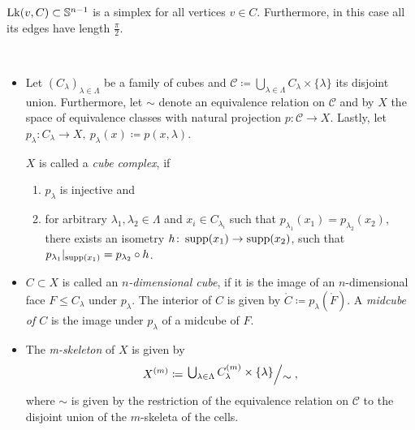 \begin{rem}
  \(\operatorname{Lk}(v,C) \subset \mathbb{S}^{n-1}\) is a simplex for all vertices \(v \in C\). Furthermore, in this case all its edges have length \(\frac{\pi}{2}\).
\end{rem}

\begin{defin}\ 
  \begin{itemize}
  \item Let \((C_\lambda)_{\lambda \in \Lambda}\) be a family of cubes and \(\mathcal{C} \coloneqq \bigcup_{\lambda \in \Lambda} C_\lambda \times \{\lambda\}\) its disjoint union. Furthermore, let \(\sim\) denote an equivalence relation on \(\mathcal{C}\) and by \(X\) the space of equivalence classes with natural projection \(p \colon \mathcal{C} \to X\). Lastly, let \(p_\lambda \colon C_\lambda \to X,\ p_\lambda(x) \coloneqq p(x, \lambda)\).

    \(X\) is called a \emph{cube complex}, if
    \begin{enumerate}
    \item \(p_\lambda\) is injective and
    \item for arbitrary \(\lambda_1, \lambda_2 \in \Lambda\) and \(x_i \in C_{\lambda_i}\) such that \(p_{\lambda_1}(x_1) = p_{\lambda_2}(x_2)\), there exists an isometry \(h\colon \operatorname{supp}(x_1) \to \operatorname{supp}(x_2)\), such that \(p_{\lambda_1}|_{\operatorname{supp}(x_1)} = p_{\lambda_2} \circ h\).
    \end{enumerate}
  \item \(C \subset X\) is called an \emph{\(n\)-dimensional cube}, if it is the image of an \(n\)-dimensional face \(F \leq C_\lambda\) under \(p_\lambda\). The interior of \(C\) is given by \(\mathring C \coloneqq p_\lambda(\mathring F)\). A \emph{midcube of \(C\)} is the image under \(p_\lambda\) of a midcube of \(F\).
  \item The \emph{m-skeleton} of \(X\) is given by
    \begin{align*}
      X^{(m)} \coloneqq \quot{\bigcup_{\lambda \in \Lambda} C_\lambda^{(m)} \times \{\lambda\}}{\sim},
    \end{align*}
    where \(\sim\) is given by the restriction of the equivalence relation on \(\mathcal{C}\) to the disjoint union of the \(m\)-skeleta of the cells.


\end{itemize}
\end{defin}
